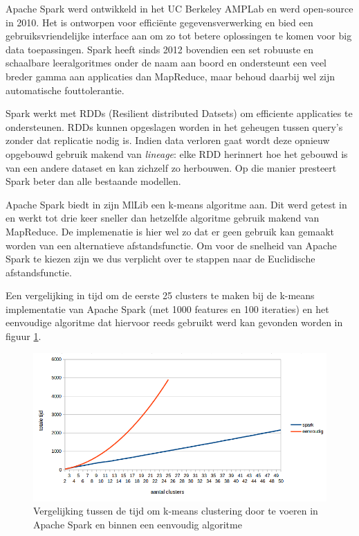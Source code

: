 Apache Spark werd ontwikkeld in het UC Berkeley AMPLab en werd open-source in 2010. Het is ontworpen voor effici\"ente gegevensverwerking en bied een gebruiksvriendelijke interface aan om zo tot betere oplossingen te komen voor big data toepassingen. Spark heeft sinds 2012 bovendien een set robuuste en schaalbare leeralgoritmes onder de naam  aan boord en ondersteunt een veel breder gamma aan applicaties dan MapReduce, maar behoud daarbij wel zijn automatische fouttolerantie.
 
Spark werkt met RDDs (Resilient distributed Datsets) om efficiente applicaties te ondersteunen. RDDs kunnen opgeslagen worden in het geheugen tussen query's zonder dat replicatie nodig is. Indien data verloren gaat wordt deze opnieuw opgebouwd gebruik makend van \textit{lineage}: elke RDD herinnert hoe het gebouwd is van een andere dataset en kan zichzelf zo herbouwen. Op die manier presteert Spark beter dan alle bestaande modellen.

Apache Spark biedt in zijn MlLib een k-means algoritme aan. Dit werd getest in \cite{Gopalani2015a} en werkt tot drie keer sneller dan hetzelfde algoritme gebruik makend van MapReduce. De implemenatie is hier wel zo dat er geen gebruik kan gemaakt worden van een alternatieve afstandsfunctie. Om voor de snelheid van Apache Spark te kiezen zijn we dus verplicht over te stappen naar de Euclidische afstandsfunctie.

Een vergelijking in tijd om de eerste 25 clusters te maken bij de k-means implementatie van Apache Spark (met 1000 features en 100 iteraties) en het eenvoudige algoritme dat hiervoor reeds gebruikt werd kan gevonden worden in figuur \ref{fig:sparkvskmeans}. 

\begin{figure}[h]
	\caption{Vergelijking tussen de tijd om k-means clustering door te voeren in Apache Spark en binnen een eenvoudig algoritme}
	\label{fig:sparkvskmeans}	
	\includegraphics[width=\textwidth]{fig/sparkvsclustering.png}
\end{figure}

